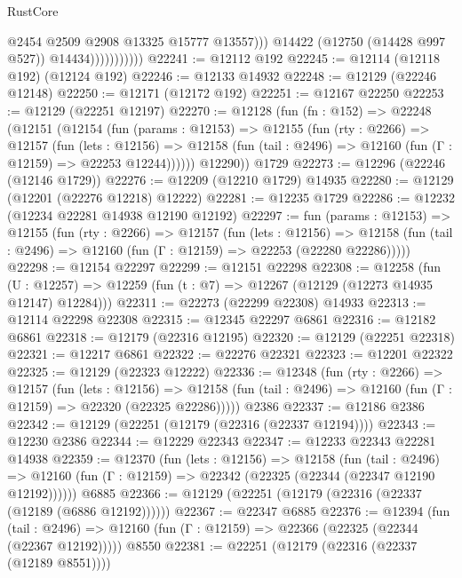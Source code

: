 \begin{lexlean}{RustCore}
\begin{coremodule}
                                @2454
                                @2509
                                @2908
                                @13325
                                @15777
                                @13557)))
                          @14422
                          (@12750 (@14428 @997 @527))
                          @14434)))))))))))
@22241 := @12112 @192
@22245 := @12114 (@12118 @192) (@12124 @192)
@22246 := @12133 @14932
@22248 := @12129 (@22246 @12148)
@22250 := @12171 (@12172 @192)
@22251 := @12167 @22250
@22253 := @12129 (@22251 @12197)
@22270 := @12128
    (fun (fn : @152) =>
    @22248
      (@12151
        (@12154
          (fun (params : @12153) =>
          @12155
            (fun (rty : @2266) =>
            @12157
              (fun (lets : @12156) =>
              @12158 (fun (tail : @2496) => @12160 (fun (Γ : @12159) => @22253 @12244))))))
        @12290))
    @1729
@22273 := @12296 (@22246 (@12146 @1729))
@22276 := @12209 (@12210 @1729) @14935
@22280 := @12129 (@12201 (@22276 @12218) @12222)
@22281 := @12235 @1729
@22286 := @12232 (@12234 @22281 @14938 @12190 @12192)
@22297 := fun (params : @12153) =>
  @12155
    (fun (rty : @2266) =>
    @12157
      (fun (lets : @12156) =>
      @12158 (fun (tail : @2496) => @12160 (fun (Γ : @12159) => @22253 (@22280 @22286)))))
@22298 := @12154 @22297
@22299 := @12151 @22298
@22308 := @12258
    (fun (U : @12257) => @12259 (fun (t : @7) => @12267 (@12129 (@12273 @14935 @12147) @12284)))
@22311 := @22273 (@22299 @22308) @14933
@22313 := @12114 @22298 @22308
@22315 := @12345 @22297 @6861
@22316 := @12182 @6861
@22318 := @12179 (@22316 @12195)
@22320 := @12129 (@22251 @22318)
@22321 := @12217 @6861
@22322 := @22276 @22321
@22323 := @12201 @22322
@22325 := @12129 (@22323 @12222)
@22336 := @12348
    (fun (rty : @2266) =>
    @12157
      (fun (lets : @12156) =>
      @12158 (fun (tail : @2496) => @12160 (fun (Γ : @12159) => @22320 (@22325 @22286)))))
    @2386
@22337 := @12186 @2386
@22342 := @12129 (@22251 (@12179 (@22316 (@22337 @12194))))
@22343 := @12230 @2386
@22344 := @12229 @22343
@22347 := @12233 @22343 @22281 @14938
@22359 := @12370
    (fun (lets : @12156) =>
    @12158
      (fun (tail : @2496) =>
      @12160 (fun (Γ : @12159) => @22342 (@22325 (@22344 (@22347 @12190 @12192))))))
    @6885
@22366 := @12129 (@22251 (@12179 (@22316 (@22337 (@12189 (@6886 @12192))))))
@22367 := @22347 @6885
@22376 := @12394
    (fun (tail : @2496) => @12160 (fun (Γ : @12159) => @22366 (@22325 (@22344 (@22367 @12192)))))
    @8550
@22381 := @22251 (@12179 (@22316 (@22337 (@12189 @8551))))

\end{coremodule}
\end{lexlean}
